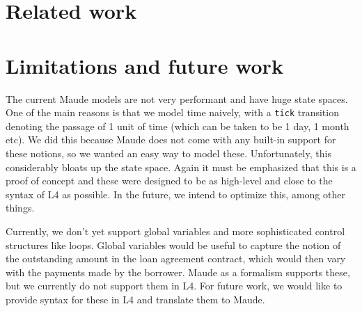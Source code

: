 \documentclass{article}
\begin{document}

\section{Related work}

\section{Limitations and future work}
The current Maude models are not very performant and have huge state spaces.
One of the main reasons is that we model time naively, with a \texttt{tick}
transition denoting the passage of 1 unit of time (which can be taken to be
1 day, 1 month etc).
We did this because Maude does not come with any built-in support for these notions,
so we wanted an easy way to model these.
Unfortunately, this considerably bloats up the state space.
Again it must be emphasized that this is a proof of concept and these were
designed to be as high-level and close to the syntax of L4 as possible.
In the future, we intend to optimize this, among other things.

Currently, we don't yet support global variables and more sophisticated control
structures like loops.
Global variables would be useful to capture the notion of the outstanding amount
in the loan agreement contract, which would then vary with the payments made by
the borrower.
Maude as a formalism supports these, but we currently do not support them in L4.
For future work, we would like to provide syntax for these in L4 and translate
them to Maude.

\newpage



\end{document}
